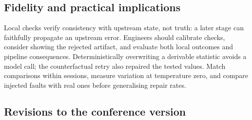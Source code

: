 \subsection{Fidelity and practical implications}
\label{sec:discussion-local}
Local checks verify consistency with upstream state, not truth: a later stage
can faithfully propagate an upstream error. Engineers should calibrate checks,
consider showing the rejected artifact, and evaluate both local outcomes and
pipeline consequences. Deterministically overwriting a derivable statistic
avoids a model call; the counterfactual retry also repaired the tested values.
Match comparisons within sessions, measure variation at temperature zero, and
compare injected faults with real ones before generalising repair rates.

\subsection{Revisions to the conference version}
\label{sec:discussion-reconcile}

